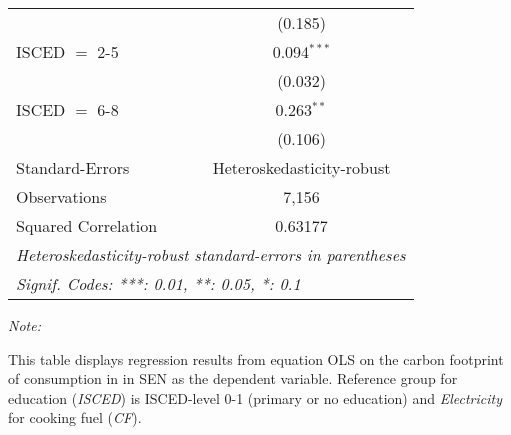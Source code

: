 \begin{table}[htbp!]
\begin{adjustbox}{width = 1\textwidth, max height = 0.95\textheight, center}
\begin{threeparttable}[b]
\begin{tabular}{lc}
                                & (0.185)\\   
            ISCED $=$ 2-5       & 0.094$^{***}$\\   
                                & (0.032)\\   
            ISCED $=$ 6-8       & 0.263$^{**}$\\   
                                & (0.106)\\   
            \midrule 
            Standard-Errors     & Heteroskedasticity-robust \\   
            Observations        & 7,156\\  
            Squared Correlation & 0.63177\\  
            \midrule \midrule
            \multicolumn{2}{l}{\emph{Heteroskedasticity-robust standard-errors in parentheses}}\\
            \multicolumn{2}{l}{\emph{Signif. Codes: ***: 0.01, **: 0.05, *: 0.1}}\\
         \end{tabular}
         
         \begin{tablenotes}\item \medskip \textit{Note:}
            \item This table displays regression results from equation OLS on the carbon footprint of consumption in  in SEN as the dependent variable.  Reference group for education (\textit{ISCED}) is ISCED-level 0-1 (primary or no education) and \textit{Electricity} for cooking fuel (\textit{CF}).
         \end{tablenotes}
      \end{threeparttable}
   \end{adjustbox}
\end{table}


